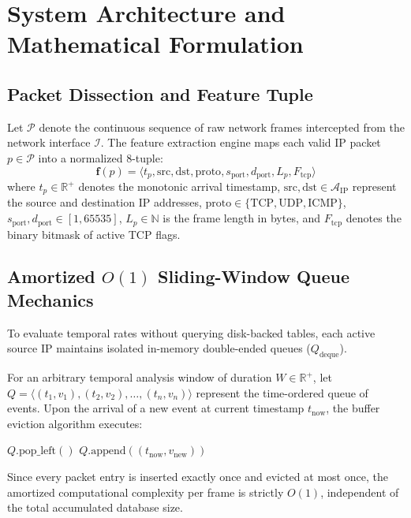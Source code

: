 \documentclass[conference]{IEEEtran}
\begin{document}
\section{System Architecture and Mathematical Formulation}

\subsection{Packet Dissection and Feature Tuple}
Let $\mathcal{P}$ denote the continuous sequence of raw network frames intercepted from the network interface $\mathcal{I}$. The feature extraction engine maps each valid IP packet $p \in \mathcal{P}$ into a normalized 8-tuple:
\begin{equation}
\mathbf{f}(p) = \langle t_p, \text{src}, \text{dst}, \text{proto}, s_{\text{port}}, d_{\text{port}}, L_p, F_{\text{tcp}} \rangle
\end{equation}
where $t_p \in \mathbb{R}^+$ denotes the monotonic arrival timestamp, $\text{src}, \text{dst} \in \mathcal{A}_{\text{IP}}$ represent the source and destination IP addresses, $\text{proto} \in \{\text{TCP}, \text{UDP}, \text{ICMP}\}$, $s_{\text{port}}, d_{\text{port}} \in [1, 65535]$, $L_p \in \mathbb{N}$ is the frame length in bytes, and $F_{\text{tcp}}$ denotes the binary bitmask of active TCP flags.

\subsection{Amortized $O(1)$ Sliding-Window Queue Mechanics}
To evaluate temporal rates without querying disk-backed tables, each active source IP maintains isolated in-memory double-ended queues ($Q_{\text{deque}}$). 

For an arbitrary temporal analysis window of duration $W \in \mathbb{R}^+$, let $Q = \langle (t_1, v_1), (t_2, v_2), \dots, (t_n, v_n) \rangle$ represent the time-ordered queue of events. Upon the arrival of a new event at current timestamp $t_{\text{now}}$, the buffer eviction algorithm executes:
\begin{algorithmic}[1]
    \STATE $Q.\text{pop\_left}()$
\ENDWHILE
\STATE $Q.\text{append}((t_{\text{now}}, v_{\text{new}}))$
\end{algorithmic}

Since every packet entry is inserted exactly once and evicted at most once, the amortized computational complexity per frame is strictly $O(1)$, independent of the total accumulated database size.
\end{document}
